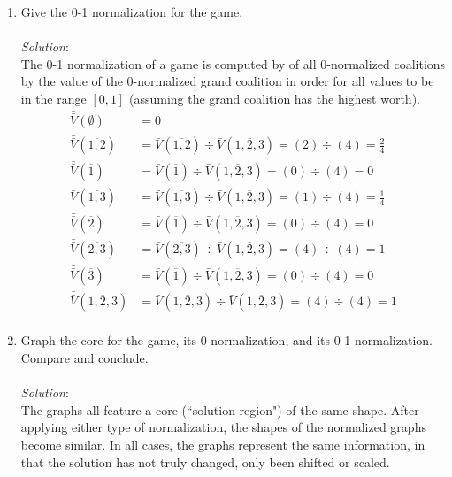 \documentclass{article}
\begin{document}
\begin{enumerate}
\begin{enumerate}
    \item Give the 0-1 normalization for the game. \\\\
    \textit{Solution}:\\
    The 0-1 normalization of a game is computed by of all 0-normalized coalitions by the value of the 0-normalized grand coalition in order for all values to be in the range $[0, 1]$ (assuming the grand coalition has the highest worth). \\
    \begin{align*}
    \bar{\bar{V}}(\emptyset)           &=  0                                                                                          \\
    \bar{\bar{V}}(\overline{1, 2})     &=  \bar{V}(\overline{1, 2}) \div \bar{V}(\overline{1, 2, 3}) = (2) \div (4)    = \frac{2}{4}  \\
    \bar{\bar{V}}(\overline{1})        &=  \bar{V}(\overline{1}) \div \bar{V}(\overline{1, 2, 3})= (0) \div (4)        = 0            \\
    \bar{\bar{V}}(\overline{1, 3})     &=  \bar{V}(\overline{1, 3}) \div \bar{V}(\overline{1, 2, 3}) = (1) \div (4)    = \frac{1}{4}  \\
    \bar{\bar{V}}(\overline{2})        &=  \bar{V}(\overline{1}) \div \bar{V}(\overline{1, 2, 3})= (0) \div (4)        = 0            \\
    \bar{\bar{V}}(\overline{2, 3})     &=  \bar{V}(\overline{2, 3}) \div \bar{V}(\overline{1, 2, 3}) = (4) \div (4)    = 1            \\
    \bar{\bar{V}}(\overline{3})        &=  \bar{V}(\overline{1}) \div \bar{V}(\overline{1, 2, 3})= (0) \div (4)        = 0            \\
    \bar{\bar{V}}(\overline{1, 2, 3})  &=  \bar{V}(\overline{1, 2, 3}) \div \bar{V}(\overline{1, 2, 3}) = (4) \div (4) = 1            \\
    \end{align*}

    \item Graph the core for the game, its 0-normalization, and its 0-1 normalization. Compare and conclude. \\\\
    \textit{Solution}:\\
    The graphs all feature a core (``solution region") of the same shape. After applying either type of normalization, the shapes of the normalized graphs become similar. In all cases, the graphs represent the same information, in that the solution has not truly changed, only been shifted or scaled.


\end{enumerate}
\end{enumerate}
\end{document}
